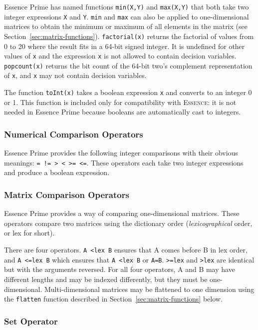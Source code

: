 \documentclass[a4paper]{article}
\newcommand{\eprime}{{\sc Essence Prime}\xspace}
\begin{document}
\eprime has named functions {\tt min(X,Y)} and {\tt max(X,Y)} that both take 
two integer expressions \texttt{X} and \texttt{Y}. 
\texttt{min} and \texttt{max} can also be applied to one-dimensional matrices to
obtain the minimum or maximum of all elements in the matrix (see Section~\ref{sec:matrix-functions}).
\texttt{factorial(x)} returns the factorial of values from 0 to 20 where the result fits in
a 64-bit signed integer. It is undefined for other values of \texttt{x} and the expression \texttt{x} is not 
allowed to contain decision variables. \texttt{popcount(x)} returns the bit count of the 
64-bit two's complement representation of \texttt{x}, and \texttt{x} may not contain 
decision variables. 

The function \texttt{toInt(x)} takes a boolean expression \texttt{x} and 
converts to an integer 0 or 1. This function is included only for compatibility with 
\textsc{Essence}: it is not needed in \eprime because booleans are automatically cast to
integers. 

\subsubsection{Numerical Comparison Operators}

\eprime provides the following integer comparisons with their obvious meanings: 
{\tt = != > < >= <=}. These operators each take two integer expressions and produce
a boolean expression. 

\subsubsection{Matrix Comparison Operators}

\eprime provides a way of comparing one-dimensional matrices. These operators compare two 
matrices using the dictionary order (\textit{lexicographical} order, or lex for 
short). 

There are four operators. {\tt A <lex B} ensures that A comes before B in 
lex order, and {\tt A <=lex B} which ensures that {\tt A <lex B} or {\tt A=B}.
{\tt >=lex} and {\tt >lex} are identical but with the arguments reversed. 
For all four operators, A and B may have different lengths and may be indexed differently, but they must be
one-dimensional.  Multi-dimensional matrices may be flattened to one dimension using
the \texttt{flatten} function described in Section~\ref{sec:matrix-functions} below. 

\subsubsection{Set Operator}
\end{document}
